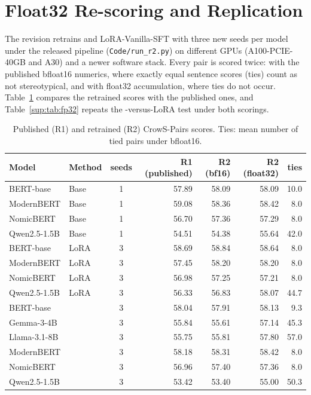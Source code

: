 \section{Float32 Re-scoring and Replication}
\label{sup:fp32}

The revision retrains \PEAT{} and LoRA-Vanilla-SFT with three new seeds per model under the released
pipeline (\texttt{Code/run\_r2.py}) on different GPUs (A100-PCIE-40GB and A30) and a newer software stack.
Every pair is scored twice: with the published bfloat16 numerics, where exactly equal sentence scores
(ties) count as not stereotypical, and with float32 accumulation, where ties do not occur.
Table~\ref{sup:tab:repro} compares the retrained scores with the published ones, and
Table~\ref{sup:tab:fp32} repeats the \PEAT{}-versus-LoRA test under both scorings.

\begin{table}[h]
  \centering
  \caption{Published (R1) and retrained (R2) CrowS-Pairs scores. Ties: mean number of tied pairs under bfloat16.}
  \label{sup:tab:repro}
  \footnotesize\setlength{\tabcolsep}{4pt}
  \begin{tabular}{@{}llcrrrr@{}}
    \toprule
    Model & Method & seeds & R1 (published) & R2 (bf16) & R2 (float32) & ties \\
    \midrule
    BERT-base & Base & 1 & 57.89 & 58.09 & 58.09 & 10.0 \\
    ModernBERT & Base & 1 & 59.08 & 58.36 & 58.42 & 8.0 \\
    NomicBERT & Base & 1 & 56.70 & 57.36 & 57.29 & 8.0 \\
    Qwen2.5-1.5B & Base & 1 & 54.51 & 54.38 & 55.64 & 42.0 \\
    BERT-base & LoRA & 3 & 58.69 & 58.84 & 58.64 & 8.0 \\
    ModernBERT & LoRA & 3 & 57.45 & 58.20 & 58.20 & 8.0 \\
    NomicBERT & LoRA & 3 & 56.98 & 57.25 & 57.21 & 8.0 \\
    Qwen2.5-1.5B & LoRA & 3 & 56.33 & 56.83 & 58.07 & 44.7 \\
    BERT-base & \PEAT{} & 3 & 58.04 & 57.91 & 58.13 & 9.3 \\
    Gemma-3-4B & \PEAT{} & 3 & 55.84 & 55.61 & 57.14 & 45.3 \\
    Llama-3.1-8B & \PEAT{} & 3 & 55.75 & 55.81 & 57.80 & 57.0 \\
    ModernBERT & \PEAT{} & 3 & 58.18 & 58.31 & 58.42 & 8.0 \\
    NomicBERT & \PEAT{} & 3 & 56.96 & 57.40 & 57.36 & 8.0 \\
    Qwen2.5-1.5B & \PEAT{} & 3 & 53.42 & 53.40 & 55.00 & 50.3 \\
    \bottomrule
  \end{tabular}
\end{table}

